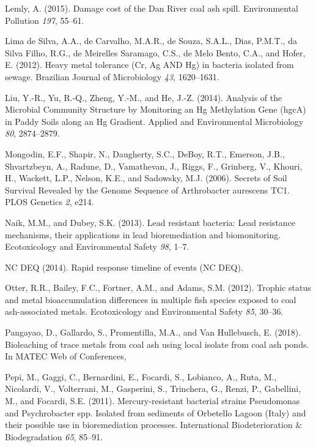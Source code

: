 \documentclass[ms, hidelinks]{uncgdissertationexp}
\theoremstyle{plain}
\theoremstyle{definition}
\theoremstyle{remark}
\begin{document}
\leavevmode\hypertarget{ref-lemlyDamageCostDan2015}{}%
Lemly, A. (2015). Damage cost of the Dan River coal ash spill. Environmental Pollution \emph{197}, 55--61.

\leavevmode\hypertarget{ref-limadesilvaHeavyMetalTolerance2012}{}%
Lima de Silva, A.A., de Carvalho, M.A.R., de Souza, S.A.L., Dias, P.M.T., da Silva Filho, R.G., de Meirelles Saramago, C.S., de Melo Bento, C.A., and Hofer, E. (2012). Heavy metal tolerance (Cr, Ag AND Hg) in bacteria isolated from sewage. Brazilian Journal of Microbiology \emph{43}, 1620--1631.

\leavevmode\hypertarget{ref-liuAnalysisMicrobialCommunity2014}{}%
Liu, Y.-R., Yu, R.-Q., Zheng, Y.-M., and He, J.-Z. (2014). Analysis of the Microbial Community Structure by Monitoring an Hg Methylation Gene (hgcA) in Paddy Soils along an Hg Gradient. Applied and Environmental Microbiology \emph{80}, 2874--2879.

\leavevmode\hypertarget{ref-mongodinSecretsSoilSurvival2006}{}%
Mongodin, E.F., Shapir, N., Daugherty, S.C., DeBoy, R.T., Emerson, J.B., Shvartzbeyn, A., Radune, D., Vamathevan, J., Riggs, F., Grinberg, V., Khouri, H., Wackett, L.P., Nelson, K.E., and Sadowsky, M.J. (2006). Secrets of Soil Survival Revealed by the Genome Sequence of Arthrobacter aurescens TC1. PLOS Genetics \emph{2}, e214.

\leavevmode\hypertarget{ref-naikLeadResistantBacteria2013}{}%
Naik, M.M., and Dubey, S.K. (2013). Lead resistant bacteria: Lead resistance mechanisms, their applications in lead bioremediation and biomonitoring. Ecotoxicology and Environmental Safety \emph{98}, 1--7.

\leavevmode\hypertarget{ref-ncdeqRapidResponseTimeline2014}{}%
NC DEQ (2014). Rapid response timeline of events (NC DEQ).

\leavevmode\hypertarget{ref-otterTrophicStatusMetal2012}{}%
Otter, R.R., Bailey, F.C., Fortner, A.M., and Adams, S.M. (2012). Trophic status and metal bioaccumulation differences in multiple fish species exposed to coal ash-associated metals. Ecotoxicology and Environmental Safety \emph{85}, 30--36.

\leavevmode\hypertarget{ref-pangayaoBioleachingTraceMetals2018}{}%
Pangayao, D., Gallardo, S., Promentilla, M.A., and Van Hullebusch, E. (2018). Bioleaching of trace metals from coal ash using local isolate from coal ash ponds. In MATEC Web of Conferences,

\leavevmode\hypertarget{ref-pepiMercuryresistantBacterialStrains2011}{}%
Pepi, M., Gaggi, C., Bernardini, E., Focardi, S., Lobianco, A., Ruta, M., Nicolardi, V., Volterrani, M., Gasperini, S., Trinchera, G., Renzi, P., Gabellini, M., and Focardi, S.E. (2011). Mercury-resistant bacterial strains Pseudomonas and Psychrobacter spp. Isolated from sediments of Orbetello Lagoon (Italy) and their possible use in bioremediation processes. International Biodeterioration \& Biodegradation \emph{65}, 85--91.
\end{document}

